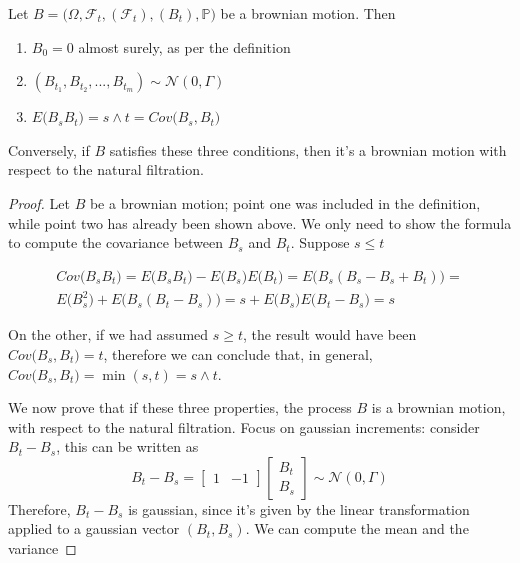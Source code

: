 \begin{proposition}
    Let $B = \big( \Omega, \mathcal{F}_t, (\mathcal{F}_t), (B_t), \mathbb{P} \big)$ be a brownian motion. Then
    \begin{enumerate}
        \item $B_0 = 0$ almost surely, as per the definition
        \item $(B_{t_1},B_{t_2},...,B_{t_m}) \sim \mathcal{N}(0,\Gamma)$
        \item $E \big( B_s B_t \big) = s \wedge t = Cov\big(B_s,B_t\big)$
    \end{enumerate}
    Conversely, if $B$ satisfies these three conditions, then it's a brownian motion with respect to the natural filtration. 
\end{proposition}
\begin{proof}
    Let $B$ be a brownian motion; point one was included in the definition, while point two has already been shown above. We only need to show the formula to compute the covariance between $B_s$ and $B_t$. Suppose $s \leq t$

    \begin{gather*}
        Cov\big(B_s B_t\big) = E\big(B_s B_t\big) - E\big(B_s\big) E\big(B_t\big) =  E\big( B_s (B_s - B_s + B_t) \big) = \\
        E\big(B_s^2\big) + E\big( B_s (B_t - B_s) \big) = s + E\big( B_s \big) E\big( B_t - B_s \big) = s
    \end{gather*}

    On the other, if we had assumed $s \geq t$, the result would have been $Cov\big(B_s, B_t\big) = t$, therefore we can conclude that, in general, $Cov\big(B_s, B_t\big) = \min(s,t) = s \wedge t$. 

    We now prove that if these three properties, the process $B$ is a brownian motion, with respect to the natural filtration. Focus on gaussian increments: consider $B_t - B_s$, this can be written as 
    \begin{equation*}
        B_t - B_s = \begin{bmatrix}
        1 & -1
        \end{bmatrix}
        \begin{bmatrix}
            B_t \\ 
            B_s
        \end{bmatrix} \sim \mathcal{N}(0,\Gamma)
    \end{equation*}
    Therefore, $B_t - B_s$ is gaussian, since it's given by the linear transformation applied to a gaussian vector $(B_t, B_s)$. We can compute the mean and the variance


\end{proof}
